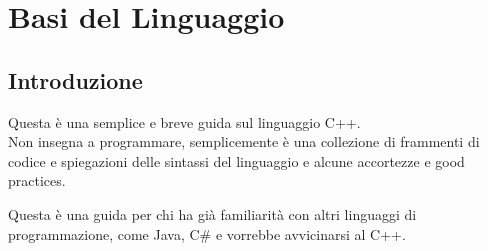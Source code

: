 
\chapter{Basi del Linguaggio}












\section{Introduzione}

\enlargethispage{1\linewidth}

\textsf{\small Questa è una semplice e breve guida sul linguaggio C++. }\\

\textsf{\small Non insegna a programmare,
semplicemente è una collezione di frammenti di codice e spiegazioni delle sintassi
del linguaggio e alcune accortezze e good practices.}

\textsf{\small Questa è una guida per chi ha già familiarità con altri linguaggi di programmazione, come Java, C\# e vorrebbe avvicinarsi al C++.}\\

